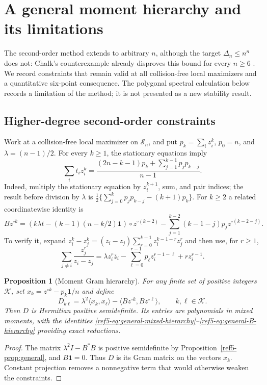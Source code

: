 \documentclass[11pt]{article}
\newtheorem{proposition}[theorem]{Proposition}
\theoremstyle{remark}
\newcommand{\one}{\mathbf 1}
\newcommand{\ip}[2]{\langle#1,#2\rangle}
\numberwithin{equation}{section}
\begin{document}
\section{A general moment hierarchy and its limitations}
\label{ref5-sec:extensions}
The second-order method extends to arbitrary $n$, although the target
$\Delta_n\le n^n$ does not: Chalk's counterexample already disproves this
bound for every $n\ge6$ \cite{Chalk}. We record constraints that remain
valid at all collision-free local maximizers and a quantitative six-point
consequence. The polygonal spectral calculation below records a
limitation of the method; it is not presented as a new stability result.

\subsection{Higher-degree second-order constraints}
Work at a collision-free local maximizer on $\mathcal S_n$, and put
$p_k=\sum_i z_i^k$, $p_0=n$, and $\lambda=(n-1)/2$.
For every $k\ge1$, the stationary equations imply
\begin{equation}\label{ref5-eq:general-mixed-hierarchy}
 \sum_i t_i z_i^k=
 \frac{(2n-k-1)p_k+\sum_{j=1}^{k-1}p_jp_{k-j}}{n-1}.
\end{equation}
Indeed, multiply the stationary equation by $z_i^{k+1}$, sum, and pair
indices; the result before division by $\lambda$ is
$\frac12\{\sum_{j=0}^k p_jp_{k-j}-(k+1)p_k\}$.
For $k\ge2$ a related coordinatewise identity is
\begin{equation}\label{ref5-eq:general-B-hierarchy}
 Bz^{\circ k}=
 \left(k\lambda t-(k-1)(n-k/2)\one\right)\circ z^{\circ(k-2)}
 -\sum_{j=1}^{k-2}(k-1-j)p_jz^{\circ(k-2-j)}.
\end{equation}
To verify it, expand
$z_i^k-z_j^k=(z_i-z_j)\sum_{r=0}^{k-1}z_i^{k-1-r}z_j^r$
and then use, for $r\ge1$,
\[
 \sum_{j\ne i}\frac{z_j^r}{z_i-z_j}
 =\lambda z_i^r\overline z_i
 -\sum_{\ell=0}^{r-1}p_\ell z_i^{r-1-\ell}+r z_i^{r-1}.
\]

\begin{proposition}[Moment Gram hierarchy]\label{ref5-prop:moment-hierarchy}
For any finite set of positive integers $\mathcal K$, set
$x_k=z^{\circ k}-p_k\one/n$ and define
\begin{equation}\label{ref5-eq:general-D-hierarchy}
 D_{k\ell}=\lambda^2\ip{x_k}{x_\ell}
       -\ip{Bz^{\circ k}}{Bz^{\circ\ell}},\qquad k,\ell\in\mathcal K.
\end{equation}
Then $D$ is Hermitian positive semidefinite. Its entries are polynomials
in mixed moments, with the identities
\eqref{ref5-eq:general-mixed-hierarchy}--\eqref{ref5-eq:general-B-hierarchy}
providing exact reductions.
\end{proposition}
\begin{proof}
The matrix $\lambda^2I-B^*B$ is positive semidefinite by
Proposition~\ref{ref5-prop:general}, and $B\one=0$. Thus $D$ is its Gram
matrix on the vectors $x_k$. Constant projection removes a nonnegative
term that would otherwise weaken the constraints.
\end{proof}
\end{document}
